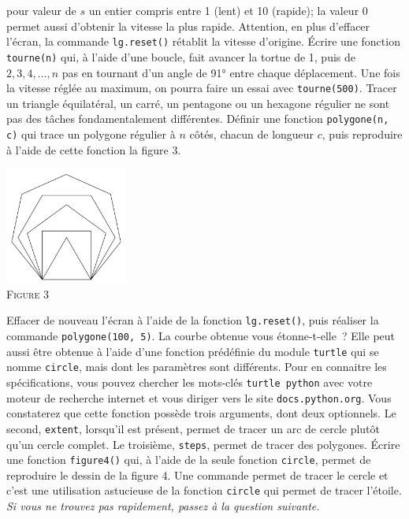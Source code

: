 \documentclass{magnoliaold}
\begin{document}
\begin{questions}
  pour valeur de $s$ un entier compris entre 1 (lent) et 10 (rapide); la valeur 0 permet aussi d'obtenir la vitesse la plus rapide. Attention, en
  plus d'effacer l'écran, la commande \verb!lg.reset()! rétablit la vitesse d'origine.
\question Écrire une fonction \verb!tourne(n)! qui, à l'aide d'une boucle, fait avancer la tortue de 1, puis de $2, 3, 4, \ldots, n$ pas en
  tournant d'un angle de \ang{91} entre chaque déplacement. Une fois
  la vitesse réglée au maximum, on pourra faire un essai avec
  \verb!tourne(500)!.
\question Tracer un triangle équilatéral, un carré, un pentagone ou un hexagone régulier ne sont
  pas des tâches fondamentalement différentes. Définir une fonction \verb!polygone(n, c)! qui
  trace un polygone régulier à $n$ côtés, chacun de longueur $c$, puis reproduire à l'aide de cette
  fonction la figure 3.
\begin{center}
\includegraphics[width=0.3\textwidth]{../../commun/images/python-tp-logo-3}\\
\textsc{Figure 3}
\end{center}
\enonce Effacer de nouveau l'écran à l'aide de la fonction \verb!lg.reset()!, puis réaliser la commande
  \verb!polygone(100, 5)!. La courbe obtenue vous étonne-t-elle~? Elle peut aussi être obtenue à l'aide
  d'une fonction prédéfinie du module \verb!turtle! qui se nomme \verb!circle!, mais dont les
  paramètres sont différents. Pour en connaitre les spécifications, vous pouvez chercher les mots-clés
  \verb!turtle python! avec votre moteur de recherche internet et vous diriger vers le site \verb!docs.python.org!.
  Vous constaterez que cette fonction possède trois arguments, dont deux optionnels. Le second, \verb!extent!,
  lorsqu'il est présent, permet de tracer un arc de cercle plutôt qu'un cercle complet. Le troisième,
  \verb!steps!, permet de tracer des polygones.
\question Écrire une fonction \verb!figure4()! qui, à l'aide de la seule fonction \verb!circle!, permet de reproduire le dessin de la figure 4. Une commande
  permet de tracer le cercle et c'est une utilisation astucieuse de la
  fonction \verb!circle! qui permet de tracer l'étoile.
  \emph{Si vous ne trouvez pas rapidement, passez à la question suivante.}

\end{questions}
\end{document}
